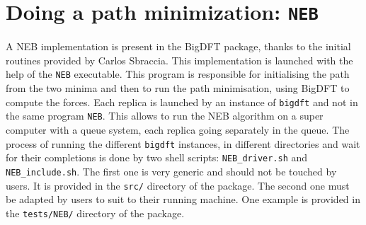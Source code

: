 \documentclass[a4paper,11pt]{report}
\begin{document}
\section{Doing a path minimization: \texttt{NEB}}
A NEB implementation is present in the BigDFT package, thanks to the initial routines provided by Carlos Sbraccia. This implementation is launched with the help of the \texttt{NEB} executable. This program is responsible for initialising the path from the two minima and then to run the path minimisation, using BigDFT to compute the forces. Each replica is launched by an instance of \texttt{bigdft} and not in the same program \texttt{NEB}. This allows to run the NEB algorithm on a super computer with a queue system, each replica going separately in the queue. 
The process of running the different \texttt{bigdft} instances, in different directories and wait for their completions is done by two shell scripts: \texttt{NEB\_driver.sh} and \texttt{NEB\_include.sh}. The first one is very generic and should not be touched by users. It is provided in the \texttt{src/} directory of the package. The second one must be adapted by users to suit to their running machine. One example is provided in the \texttt{tests/NEB/} directory of the package.
\end{document}
